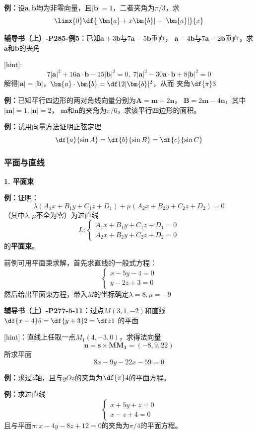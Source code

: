 {\bf 例：}设$\bm{a},\bm{b}$均为非零向量，且$|\bm{b}|=1$，二者夹角为$\pi/3$，求
$$\limx{0}\df{|\bm{a}+x\bm{b}|-|\bm{a}|}{x}$$

{\bf 辅导书（上）-P285-例5：}已知$\bm{a}+3\bm{b}$与$7\bm{a}-5\bm{b}$垂直，
$\bm{a}-4\bm{b}$与$7\bm{a}-2\bm{b}$垂直，求$\bm{a}$和$\bm{b}$的夹角

[hint]:
$$7|\bm{a}|^2+16\bm{a}\cdot\bm{b}-15|\bm{b}|^2=0,\;
7|\bm{a}|^2-30\bm{a}\cdot\bm{b}+8|\bm{b}|^2=0$$
解得$|\bm{a}|=|\bm{b}|$，$\bm{a}\cdot\bm{b}=\df12|\bm{b}|^2$，从而
夹角$\df{\pi}3$

{\bf 例：}已知平行四边形的两对角线向量分别为$\bm{A}=\bm{m}+2\bm{n}$，
$\bm{B}=2\bm{m}-4\bm{n}$，其中$|\bm{m}|=1,|\bm{n}|=2$，
$\bm{m}$和$\bm{n}$的夹角为$\pi/6$，求该平行四边形的面积。

{\bf 例：}试用向量方法证明正弦定理
$$\df{a}{\sin A}=\df{b}{\sin B}=\df{c}{\sin C}$$

\subsubsection{平面与直线}

{\bf 1. 平面束}

{\bf 例：}证明：$$\lambda(A_1x+B_1y+C_1z+D_1)+\mu(A_2x+B_2y+C_2z+D_2)=0$$
（其中$\lambda,\mu$不全为零）为过直线
$$L:\left\{\begin{array}{l}
	A_1x+B_1y+C_1z+D_1=0\\
	A_2x+B_2y+C_2z+D_2=0
\end{array}\right.$$
的{\bf 平面束}。

前例可用平面束求解，首先求直线的一般式方程：
$$\left\{\begin{array}{l}x-5y-4=0\\ y-2z+3=0\end{array}\right.$$
然后给出平面束方程，带入$M$的坐标确定$\lambda=8,\mu=-9$

{\bf 辅导书（上）-P277-5-11：}过点$M(3,1,-2)$和直线$\df{x-4}5=\df{y+3}2=\df z1$
的平面

[hint]：直线上任取一点$M_1(4,-3,0)$，求得法向量
$$\bm{n}=\bm{s}\times\bm{MM_1}=(-8,9,22)$$
所求平面
$$8x-9y-22x-59=0$$

{\bf 例：}求过$z$轴，且与$yOz$的夹角为$\df{\pi}4$的平面方程。

{\bf 例：}求过直线
$$\left\{\begin{array}{l}
	x+5y+z=0\\
	x-z+4=0
\end{array}\right.$$
且与平面$\pi:x-4y-8z+12=0$的夹角为$\pi/4$的平面方程。

